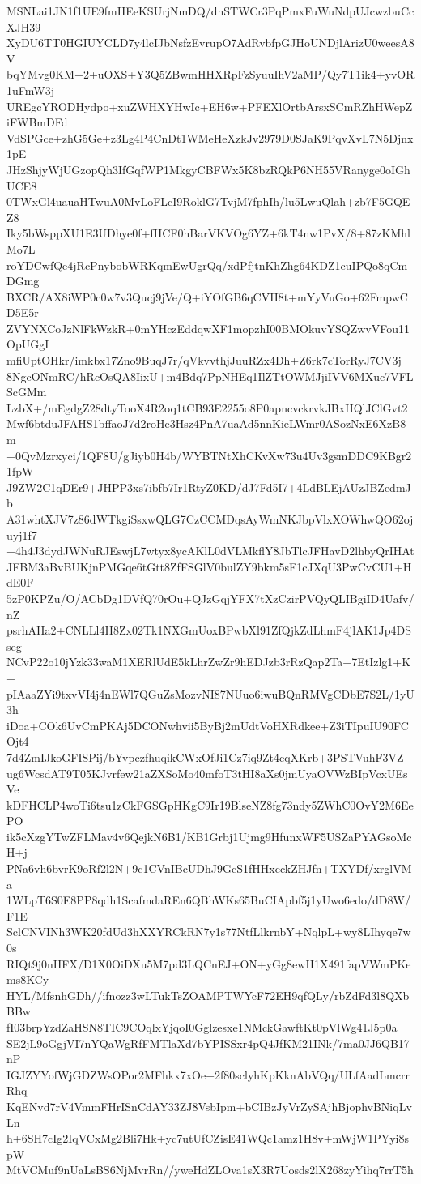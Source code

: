 MSNLai1JN1f1UE9fmHEeKSUrjNmDQ/dnSTWCr3PqPmxFuWuNdpUJcwzbuCcXJH39
XyDU6TT0HGIUYCLD7y4lcIJbNsfzEvrupO7AdRvbfpGJHoUNDjlArizU0weesA8V
bqYMvg0KM+2+uOXS+Y3Q5ZBwmHHXRpFzSyuuIhV2aMP/Qy7T1ik4+yvOR1uFmW3j
UREgcYRODHydpo+xuZWHXYHwIc+EH6w+PFEXlOrtbArsxSCmRZhHWepZiFWBmDFd
VdSPGce+zhG5Ge+z3Lg4P4CnDt1WMeHeXzkJv2979D0SJaK9PqvXvL7N5Djnx1pE
JHzShjyWjUGzopQh3IfGqfWP1MkgyCBFWx5K8bzRQkP6NH55VRanyge0oIGhUCE8
0TWxGl4uauaHTwuA0MvLoFLcI9RoklG7TvjM7fphIh/lu5LwuQlah+zb7F5GQEZ8
Iky5bWsppXU1E3UDhye0f+fHCF0hBarVKVOg6YZ+6kT4nw1PvX/8+87zKMhlMo7L
roYDCwfQe4jRcPnybobWRKqmEwUgrQq/xdPfjtnKhZhg64KDZ1cuIPQo8qCmDGmg
BXCR/AX8iWP0c0w7v3Qucj9jVe/Q+iYOfGB6qCVII8t+mYyVuGo+62FmpwCD5E5r
ZVYNXCoJzNlFkWzkR+0mYHczEddqwXF1mopzhI00BMOkuvYSQZwvVFou11OpUGgI
mfiUptOHkr/imkbx17Zno9BuqJ7r/qVkvvthjJuuRZx4Dh+Z6rk7cTorRyJ7CV3j
8NgcONmRC/hRcOsQA8IixU+m4Bdq7PpNHEq1IlZTtOWMJjiIVV6MXuc7VFLScGMm
LzbX+/mEgdgZ28dtyTooX4R2oq1tCB93E2255o8P0apncvckrvkJBxHQlJClGvt2
Mwf6btduJFAHS1bffaoJ7d2roHe3Hsz4PnA7uaAd5nnKieLWmr0ASozNxE6XzB8m
+0QvMzrxyci/1QF8U/gJiyb0H4b/WYBTNtXhCKvXw73u4Uv3gsmDDC9KBgr21fpW
J9ZW2C1qDEr9+JHPP3xs7ibfb7Ir1RtyZ0KD/dJ7Fd5I7+4LdBLEjAUzJBZedmJb
A31whtXJV7z86dWTkgiSsxwQLG7CzCCMDqsAyWmNKJbpVlxXOWhwQO62ojuyj1f7
+4h4J3dydJWNuRJEswjL7wtyx8ycAKlL0dVLMkflY8JbTlcJFHavD2lhbyQrIHAt
JFBM3aBvBUKjnPMGqe6tGtt8ZfFSGlV0bulZY9bkm5sF1cJXqU3PwCvCU1+HdE0F
5zP0KPZu/O/ACbDg1DVfQ70rOu+QJzGqjYFX7tXzCzirPVQyQLIBgiID4Uafv/nZ
psrhAHa2+CNLLl4H8Zx02Tk1NXGmUoxBPwbXl91ZfQjkZdLhmF4jlAK1Jp4DSseg
NCvP22o10jYzk33waM1XERlUdE5kLhrZwZr9hEDJzb3rRzQap2Ta+7EtIzlg1+K+
pIAaaZYi9txvVI4j4nEWl7QGuZsMozvNI87NUuo6iwuBQnRMVgCDbE7S2L/1yU3h
iDoa+COk6UvCmPKAj5DCONwhvii5ByBj2mUdtVoHXRdkee+Z3iTIpuIU90FCOjt4
7d4ZmIJkoGFISPij/bYvpczfhuqikCWxOfJi1Cz7iq9Zt4cqXKrb+3PSTVuhF3VZ
ug6WcsdAT9T05KJvrfew21aZXSoMo40mfoT3tHI8aXs0jmUyaOVWzBIpVcxUEsVe
kDFHCLP4woTi6tsu1zCkFGSGpHKgC9Ir19BlseNZ8fg73ndy5ZWhC0OvY2M6EePO
ik5cXzgYTwZFLMav4v6QejkN6B1/KB1Grbj1Ujmg9HfunxWF5USZaPYAGsoMcH+j
PNa6vh6bvrK9oRf2l2N+9c1CVnIBcUDhJ9GcS1fHHxcckZHJfn+TXYDf/xrglVMa
1WLpT6S0E8PP8qdh1ScafmdaREn6QBhWKs65BuCIApbf5j1yUwo6edo/dD8W/F1E
SclCNVINh3WK20fdUd3hXXYRCkRN7y1s77NtfLlkrnbY+NqlpL+wy8LIhyqe7w0s
RIQt9j0nHFX/D1X0OiDXu5M7pd3LQCnEJ+ON+yGg8ewH1X491fapVWmPKems8KCy
HYL/MfsnhGDh//ifnozz3wLTukTsZOAMPTWYcF72EH9qfQLy/rbZdFd3l8QXbBBw
fI03brpYzdZaHSN8TIC9COqlxYjqoI0Gglzesxe1NMckGawftKt0pVlWg41J5p0a
SE2jL9oGgjVI7nYQaWgRfFMTlaXd7bYPISSxr4pQ4JfKM21INk/7ma0JJ6QB17nP
IGJZYYofWjGDZWsOPor2MFhkx7xOe+2f80sclyhKpKknAbVQq/ULfAadLmcrrRhq
KqENvd7rV4VmmFHrISnCdAY33ZJ8VsbIpm+bCIBzJyVrZySAjhBjophvBNiqLvLn
h+6SH7cIg2IqVCxMg2Bli7Hk+yc7utUfCZisE41WQc1amz1H8v+mWjW1PYyi8spW
MtVCMuf9nUaLsBS6NjMvrRn//yweHdZLOva1sX3R7Uosds2lX268zyYihq7rrT5h
